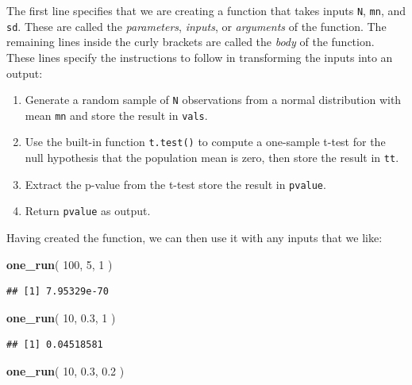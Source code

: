 \documentclass[
]{book}
\newenvironment{Shaded}{\begin{snugshade}}{\end{snugshade}}
\newcommand{\DecValTok}[1]{\textcolor[rgb]{0.00,0.00,0.81}{#1}}
\newcommand{\FloatTok}[1]{\textcolor[rgb]{0.00,0.00,0.81}{#1}}
\newcommand{\FunctionTok}[1]{\textcolor[rgb]{0.13,0.29,0.53}{\textbf{#1}}}
\newcommand{\NormalTok}[1]{#1}
\providecommand{\tightlist}{%
  \setlength{\itemsep}{0pt}\setlength{\parskip}{0pt}}
\begin{document}
The first line specifies that we are creating a function that takes inputs \texttt{N}, \texttt{mn}, and \texttt{sd}. These are called the \emph{parameters}, \emph{inputs}, or \emph{arguments} of the function. The remaining lines inside the curly brackets are called the \emph{body} of the function. These lines specify the instructions to follow in transforming the inputs into an output:

\begin{enumerate}
\def\labelenumi{\arabic{enumi}.}
\tightlist
\item
  Generate a random sample of \texttt{N} observations from a normal distribution with mean \texttt{mn} and store the result in \texttt{vals}.
\item
  Use the built-in function \texttt{t.test()} to compute a one-sample t-test for the null hypothesis that the population mean is zero, then store the result in \texttt{tt}.
\item
  Extract the p-value from the t-test store the result in \texttt{pvalue}.
\item
  Return \texttt{pvalue} as output.
\end{enumerate}

Having created the function, we can then use it with any inputs that we like:

\begin{Shaded}
\begin{Highlighting}[]
\FunctionTok{one\_run}\NormalTok{( }\DecValTok{100}\NormalTok{, }\DecValTok{5}\NormalTok{, }\DecValTok{1}\NormalTok{ )}
\end{Highlighting}
\end{Shaded}

\begin{verbatim}
## [1] 7.95329e-70
\end{verbatim}

\begin{Shaded}
\begin{Highlighting}[]
\FunctionTok{one\_run}\NormalTok{( }\DecValTok{10}\NormalTok{, }\FloatTok{0.3}\NormalTok{, }\DecValTok{1}\NormalTok{ )}
\end{Highlighting}
\end{Shaded}

\begin{verbatim}
## [1] 0.04518581
\end{verbatim}

\begin{Shaded}
\begin{Highlighting}[]
\FunctionTok{one\_run}\NormalTok{( }\DecValTok{10}\NormalTok{, }\FloatTok{0.3}\NormalTok{, }\FloatTok{0.2}\NormalTok{ )}
\end{Highlighting}
\end{Shaded}
\end{document}
